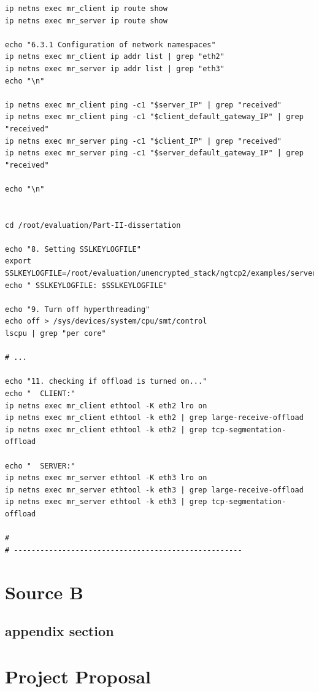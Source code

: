 \documentclass[12pt,a4paper,twoside,openright]{report}
\begin{document}
\begin{verbatim}
ip netns exec mr_client ip route show
ip netns exec mr_server ip route show

echo "6.3.1 Configuration of network namespaces"
ip netns exec mr_client ip addr list | grep "eth2"
ip netns exec mr_server ip addr list | grep "eth3"
echo "\n"

ip netns exec mr_client ping -c1 "$server_IP" | grep "received"
ip netns exec mr_client ping -c1 "$client_default_gateway_IP" | grep "received"
ip netns exec mr_server ping -c1 "$client_IP" | grep "received"
ip netns exec mr_server ping -c1 "$server_default_gateway_IP" | grep "received"

echo "\n"


cd /root/evaluation/Part-II-dissertation

echo "8. Setting SSLKEYLOGFILE"
export SSLKEYLOGFILE=/root/evaluation/unencrypted_stack/ngtcp2/examples/server.key
echo " SSLKEYLOGFILE: $SSLKEYLOGFILE"

echo "9. Turn off hyperthreading"
echo off > /sys/devices/system/cpu/smt/control
lscpu | grep "per core"

# ...

echo "11. checking if offload is turned on..."
echo "  CLIENT:"
ip netns exec mr_client ethtool -K eth2 lro on
ip netns exec mr_client ethtool -k eth2 | grep large-receive-offload
ip netns exec mr_client ethtool -k eth2 | grep tcp-segmentation-offload

echo "  SERVER:"
ip netns exec mr_server ethtool -K eth3 lro on
ip netns exec mr_server ethtool -k eth3 | grep large-receive-offload
ip netns exec mr_server ethtool -k eth3 | grep tcp-segmentation-offload

#
# ----------------------------------------------------

\end{verbatim}

\chapter{Source B}

    \section{appendix section}\label{referencedAppendixTag}


\chapter{Project Proposal}



 
\end{document}
